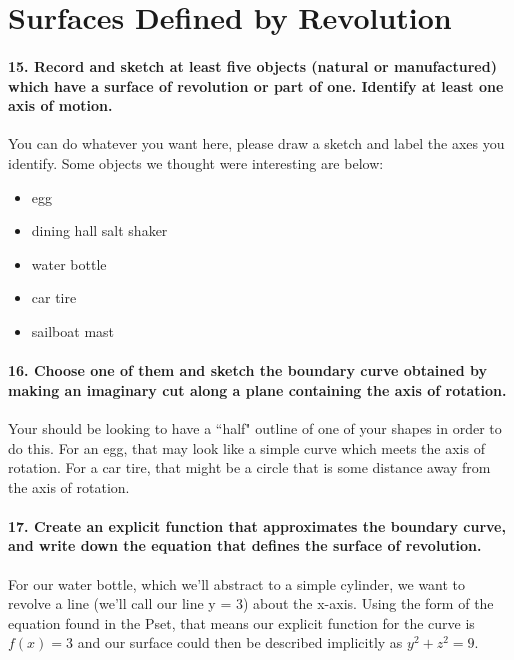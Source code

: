 \documentclass{article}
\begin{document}
\section{Surfaces Defined by Revolution}

\paragraph{15. Record and sketch at least five objects (natural or manufactured) which have a surface of revolution or part of one. Identify at least one axis of motion.} 

You can do whatever you want here, please draw a sketch and label the axes you identify. Some objects we thought were interesting are below:

\begin{itemize}
    \item egg
    \item dining hall salt shaker
    \item water bottle
    \item car tire
    \item sailboat mast
\end{itemize}

\paragraph{16. Choose one of them and sketch the boundary curve obtained by making an imaginary cut along a plane containing the axis of rotation.}

Your should be looking to have a ``half" outline of one of your shapes in order to do this. For an egg, that may look like a simple curve which meets the axis of rotation. For a car tire, that might be a circle that is some distance away from the axis of rotation. 

\paragraph{17. Create an explicit function that approximates the boundary curve, and write down the equation that defines the surface of revolution.}

For our water bottle, which we'll abstract to a simple cylinder, we want to revolve a line (we'll call our line y = 3) about the x-axis. Using the form of the equation found in the Pset, that means our explicit function for the curve is $f(x) = 3$ and our surface could then be described implicitly as $y^2 + z^2 = 9$.
\end{document}
